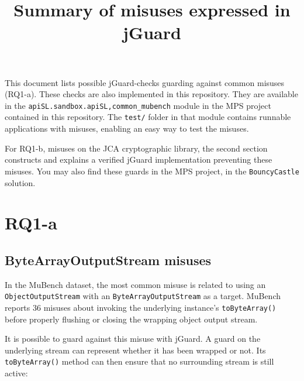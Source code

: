 \documentclass{article}
\title{Summary of misuses expressed in jGuard}
\begin{document}
\maketitle

This document lists possible jGuard-checks guarding against common misuses (RQ1-a).
These checks are also implemented in this repository. They are available in the \texttt{apiSL.sandbox.apiSL,common\_mubench} module in the MPS project contained in this
repository. The \texttt{test/} folder in that module contains runnable applications with
misuses, enabling an easy way to test the misuses.

For RQ1-b, misuses on the JCA cryptographic library, the second section constructs
and explains a verified jGuard implementation preventing these misuses.
You may also find these guards in the MPS project, in the \texttt{BouncyCastle} solution.

\section{RQ1-a}

\subsection{ByteArrayOutputStream misuses}

In the MuBench dataset, the most common misuse is related to using an \texttt{Object\allowbreak Output\allowbreak Stream}
with an \texttt{ByteArrayOutputStream} as a target.
MuBench reports 36 misuses about invoking the underlying instance's \texttt{toByteArray()} before
properly flushing or closing the wrapping object output stream.

It is possible to guard against this misuse with jGuard.
A guard on the underlying stream can represent whether it has been wrapped or not.
Its \texttt{toByteArray()} method can then ensure that no surrounding stream is still active:
\end{document}
